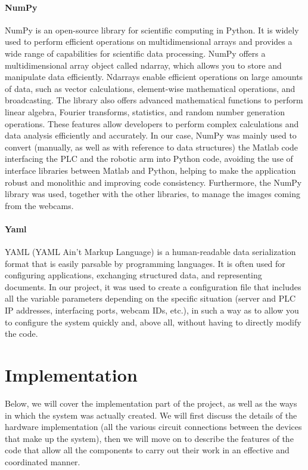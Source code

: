 \documentclass[a4paper,11pt]{report}
\theoremstyle{definition}
\theoremstyle{plain}
\begin{document}
            \subsubsection{NumPy}
                NumPy is an open-source library for scientific computing in Python. It is widely used to perform efficient operations on multidimensional arrays and provides a wide range of capabilities for scientific data processing.\newline
                NumPy offers a multidimensional array object called ndarray, which allows you to store and manipulate data efficiently. Ndarrays enable efficient operations on large amounts of data, such as vector calculations, element-wise mathematical operations, and broadcasting.\newline
                The library also offers advanced mathematical functions to perform linear algebra, Fourier transforms, statistics, and random number generation operations. These features allow developers to perform complex calculations and data analysis efficiently and accurately. \newline
                In our case, NumPy was mainly used to convert (manually, as well as with reference to data structures) the Matlab code~\cite{matlab} interfacing the PLC and the robotic arm into Python code, avoiding the use of interface libraries between Matlab and Python, helping to make the application robust and monolithic and improving code consistency. Furthermore, the NumPy library was used, together with the other libraries, to manage the images coming from the webcams.
            \subsubsection{Yaml}
                YAML (YAML Ain't Markup Language) is a human-readable data serialization format that is easily parsable by programming languages. It is often used for configuring applications, exchanging structured data, and representing documents. In our project, it was used to create a configuration file that includes all the variable parameters depending on the specific situation (server and PLC IP addresses, interfacing ports, webcam IDs, etc.), in such a way as to allow you to configure the system quickly and, above all, without having to directly modify the code.
\chapter{Implementation}
    Below, we will cover the implementation part of the project, as well as the ways in which the system was actually created. We will first discuss the details of the hardware implementation (all the various circuit connections between the devices that make up the system), then we will move on to describe the features of the code that allow all the components to carry out their work in an effective and coordinated manner.
\end{document}
